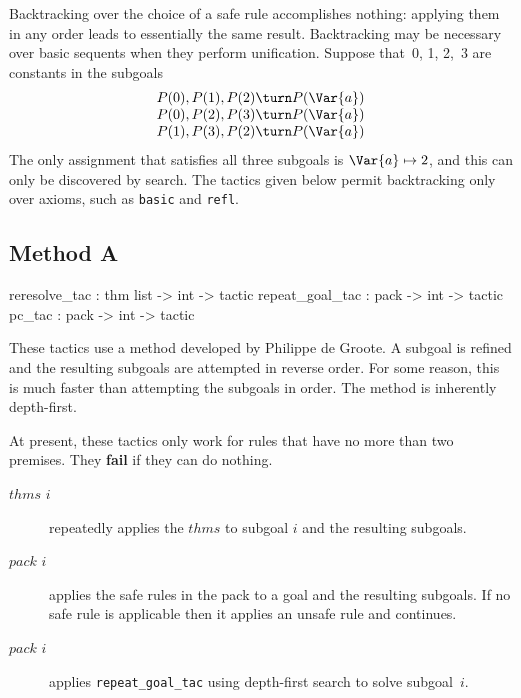 Backtracking over the choice of a safe rule accomplishes nothing: applying
them in any order leads to essentially the same result.  Backtracking may
be necessary over basic sequents when they perform unification.  Suppose
that~0, 1, 2,~3 are constants in the subgoals
\[  \begin{array}{c}
      P(0), P(1), P(2) \turn P(\Var{a})  \\
      P(0), P(2), P(3) \turn P(\Var{a})  \\
      P(1), P(3), P(2) \turn P(\Var{a})  
    \end{array}
\]
The only assignment that satisfies all three subgoals is $\Var{a}\mapsto 2$,
and this can only be discovered by search.  The tactics given below permit
backtracking only over axioms, such as {\tt basic} and {\tt refl}.


\subsection{Method A}
\begin{ttbox} 
reresolve_tac   : thm list -> int -> tactic
repeat_goal_tac : pack -> int -> tactic
pc_tac          : pack -> int -> tactic
\end{ttbox}
These tactics use a method developed by Philippe de Groote.  A subgoal is
refined and the resulting subgoals are attempted in reverse order.  For
some reason, this is much faster than attempting the subgoals in order.
The method is inherently depth-first.

At present, these tactics only work for rules that have no more than two
premises.  They {\bf fail} if they can do nothing.
\begin{description}
\item[ $thms$ $i$] 
repeatedly applies the $thms$ to subgoal $i$ and the resulting subgoals.

\item[ $pack$ $i$] 
applies the safe rules in the pack to a goal and the resulting subgoals.
If no safe rule is applicable then it applies an unsafe rule and continues.

\item[ $pack$ $i$] 
applies {\tt repeat_goal_tac} using depth-first search to solve subgoal~$i$.
\end{description}


